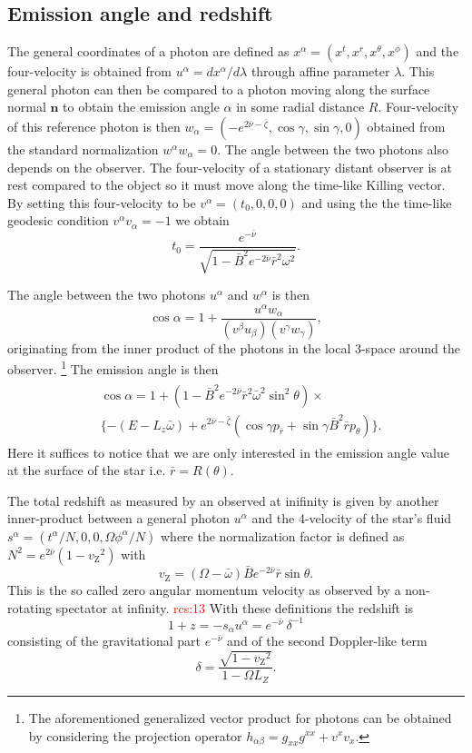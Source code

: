 \documentclass[iop, usenatbib]{emulateapj}
\newcommand{\be}{\begin{equation}}
\newcommand{\ee}{\end{equation}}
\renewcommand{\vec}[1]{\ensuremath{\boldsymbol{#1}}​}
\newcommand{\red}[1]{\textcolor{red}{#1}}
\newcommand{\Ca}{\ensuremath{\mathcal{C}}}
\newcommand{\rb}{\ensuremath{\bar{r}}}
\newcommand{\wb}{\ensuremath{\bar{\omega}}}
\newcommand{\nub}{\ensuremath{\bar{\nu}}}
\newcommand{\zetab}{\ensuremath{\bar{\zeta}}}
\newcommand{\Bb}{\ensuremath{\bar{B}}}
\newcommand{\vz}{\ensuremath{v_{\mathrm{Z}}}}
\begin{document}
\subsection{Emission angle and redshift}
The general coordinates of a photon are defined as $x^{\alpha} = (x^{t}, x^{r}, x^{\theta}, x^{\phi})$ and the four-velocity is obtained from $u^{\alpha} = dx^{\alpha}/d\lambda$ through affine parameter $\lambda$.
This general photon can then be compared to a photon moving along the surface normal $\vec{n}$ to obtain the emission angle $\alpha$ in some radial distance $R$.
Four-velocity of this reference photon is then $w_{\alpha} = (-e^{2\nub-\zetab}, \cos\gamma, \sin\gamma, 0 )$ obtained from the standard normalization $w^{\alpha}w_{\alpha} = 0$.
The angle between the two photons also depends on the observer.
The four-velocity of a stationary distant observer is at rest compared to the object so it must move along the time-like Killing vector.
By setting this four-velocity to be $v^{\alpha}=(t_0,0,0,0)$ and using the the time-like geodesic condition $v^{\alpha} v_{\alpha} = -1$ we obtain 
\be
t_0 = \frac{e^{-\nub}}{\sqrt{1 - \Bb^2 e^{-2\nub} \rb^2 \omega^2}}.
\ee

The angle between the two photons $u^{\alpha}$ and $w^{\alpha}$ is then \citep{PFC83}
\be
\cos \alpha = 1 + \frac{u^{\alpha}w_{\alpha}}{(v^{\beta} u_{\beta})(v^{\gamma} w_{\gamma})},
\ee
originating from the inner product of the photons in the local 3-space around the observer.%
\footnote{
The aforementioned generalized vector product for photons can be obtained by considering the projection operator $h_{\alpha \beta} = g_{xx}g^{xx} + v^xv_x$.
}
The emission angle is then
\begin{align}\begin{split}
&\cos \alpha = 1 + (1-\Bb^2 e^{-2\nub} \rb^2\wb^2\sin^2\theta) \times \\
&\{ -(E-L_z \wb) + e^{2\nub-\zetab} (\cos\gamma p_{\rb} + \sin\gamma \Bb^2 \rb p_{\theta}) \}.
\end{split}\end{align}
Here it suffices to notice that we are only interested in the emission angle value at the surface of the star i.e. $\rb = R(\theta)$.


The total redshift as measured by an observed at inifinity is given by another inner-product between a general photon $u^{\alpha}$ and the 4-velocity of the star's fluid $s^{\alpha} = (t^{\alpha}/N,0,0,\Omega \phi^{\alpha}/N)$ where the normalization factor is defined as $N^2 = e^{2\nub} (1 - \vz^2)$ with
\be
\vz = (\Omega - \wb) \Bb e^{-2\nub} \rb \sin\theta.
\ee
This is the so called zero angular momentum velocity as observed by a non-rotating spectator at infinity. \red{rcs:13}
With these definitions the redshift is
\be
1 + z = -s_{\alpha} u^{\alpha} = e^{-\nub} ~\delta^{-1}
\ee
consisting of the gravitational part $e^{-\nub}$ and of the second Doppler-like term
\be
\delta = \frac{\sqrt{1-\vz^2}}{1 - \Omega L_Z}.
\ee
\end{document}

